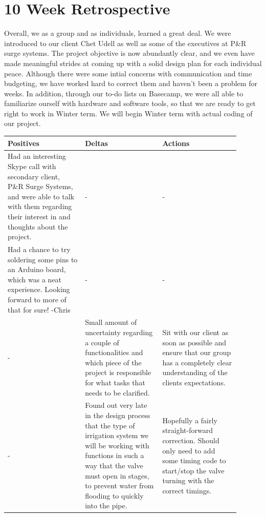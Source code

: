 \documentclass[onecolumn, draftclsnofoot,10pt, compsoc]{IEEEtran}
\begin{document}
    \section{10 Week Retrospective}
    Overall, we as a group and as individuals, learned a great deal.
    We were introduced to our client Chet Udell as well as some of the executives at P\&R surge systems.
    The project objective is now abundantly clear, and we even have made meaningful strides at coming up with a solid design plan for each individual peace. 
    Although there were some intial concerns with communication and time budgeting, we have worked hard to correct them and haven't been a problem for weeks. 
    In addition, through our to-do lists on Basecamp, we were all able to familiarize ourself with hardware and software tools, so that we are ready to get right to work in Winter term.
    We will begin Winter term with actual coding of our project.
    
    \vspace{.1in}
    \begin{center}
    \begin{tabular}{| p{0.3\linewidth}| p{0.3\linewidth}| p{0.3\linewidth}|}
    \hline
    Positives & Deltas & Actions \\
    \hline
    {Had an interesting Skype call with secondary client, P\&R Surge Systems, and were able to talk with them regarding their interest in and thoughts about the project.} & - & - \\
    \hline
    {Had a chance to try soldering some pins to an Arduino board, which was a neat experience. Looking forward to more of that for sure! -Chris} & - & - \\
    \hline
    - & {Small amount of uncertainty regarding a couple of functionalities and which piece of the project is responsible for what tasks that needs to be clarified.} & {Sit with our client as soon as possible and ensure that our group has a completely clear understanding of the clients expectations.} \\
    \hline
    - & {Found out very late in the design process that the type of irrigation system we will be working with functions in such a way that the valve must open in stages, to prevent water from flooding to quickly into the pipe.} & {Hopefully a fairly straight-forward correction. Should only need to add some timing code to start/stop the valve turning with the correct timings.} \\
    \hline
    \end{tabular}
    \end{center}

    
\end{document}
